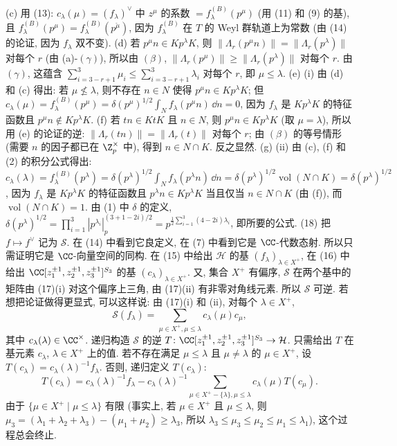\begin{solution}
(c) 用 (13): $c_{\lambda}(\mu) = (f_{\lambda})^{\vee}$ 中 $z^{\mu}$ 的系数 $= f_{\lambda}^{(B)}(p^{\mu})$ (用 (11) 和 (9) 的基), 且 $f_{\lambda}^{(B)}(p^{\mu}) = f_{\lambda}^{(B)}(p^{\check{\mu}})$, 因为 $f_{\lambda}^{(B)}$ 在 $T$ 的 Weyl 群轨道上为常数 (由 (14) 的论证, 因为 $f_{\lambda}$ 双不变).
(d) 若 $p^{\mu}n \in Kp^{\lambda}K$, 则 $\|\Lambda_r(p^{\mu}n)\| = \|\Lambda_r(p^{\lambda})\|$ 对每个 $r$ (由 (a)-$(\gamma)$), 所以由 $(\beta)$, $\|\Lambda_r(p^{\mu})\| \geq \|\Lambda_r(p^{\lambda})\|$ 对每个 $r$. 由 $(\gamma)$, 这蕴含 $\sum_{i=3-r+1}^3\mu_i \leq \sum_{i=3-r+1}^3\lambda_i$ 对每个 $r$, 即 $\mu \leq \lambda$.
(e) (i) 由 (d) 和 (c) 得出: 若 $\mu \nleq \lambda$, 则不存在 $n \in N$ 使得 $p^{\mu}n \in Kp^{\lambda}K$; 但 $c_{\lambda}(\mu) = f_{\lambda}^{(B)}(p^{\mu}) = \delta(p^{\mu})^{1/2}\int_N f_{\lambda}(p^{\mu}n)\,\dd n = 0$, 因为 $f_{\lambda}$ 是 $Kp^{\lambda}K$ 的特征函数且 $p^{\mu}n \notin Kp^{\lambda}K$.
(f) 若 $tn \in KtK$ 且 $n \in N$, 则 $p^{\mu}n \in Kp^{\lambda}K$ (取 $\mu = \lambda$), 所以用 (e) 的论证的逆: $\|\Lambda_r(tn)\| = \|\Lambda_r(t)\|$ 对每个 $r$; 由 $(\beta)$ 的等号情形 (需要 $n$ 的因子都已在 $\Z_p^{\times}$ 中), 得到 $n \in N \cap K$. 反之显然.
(g) (ii) 由 (c), (f) 和 (2) 的积分公式得出: $c_{\lambda}(\lambda) = f_{\lambda}^{(B)}(p^{\lambda}) = \delta(p^{\lambda})^{1/2}\int_N f_{\lambda}(p^{\lambda}n)\,\dd n = \delta(p^{\lambda})^{1/2}\operatorname{vol}(N \cap K) = \delta(p^{\lambda})^{1/2}$, 因为 $f_{\lambda}$ 是 $Kp^{\lambda}K$ 的特征函数且 $p^{\lambda}n \in Kp^{\lambda}K$ 当且仅当 $n \in N \cap K$ (由 (f)), 而 $\operatorname{vol}(N \cap K) = 1$. 由 (1) 中 $\delta$ 的定义, $\delta(p^{\lambda})^{1/2} = \prod_{i=1}^3|p^{\lambda_i}|_p^{(3+1-2i)/2} = p^{\frac{1}{2}\sum_{i=1}^3(4-2i)\lambda_i}$, 即所要的公式.
(18) 把 $f \longmapsto f^{\vee}$ 记为 $\mathcal{S}$. 在 (14) 中看到它良定义, 在 (7) 中看到它是 $\CC$-代数态射. 所以只需证明它是 $\CC$-向量空间的同构. 在 (15) 中给出 $\mathcal{H}$ 的基 $(f_{\lambda})_{\lambda \in X^+}$, 在 (16) 中给出 $\CC[z_1^{\pm 1}, z_2^{\pm 1}, z_3^{\pm 1}]^{S_3}$ 的基 $(c_{\lambda})_{\lambda \in X^+}$. 又, 集合 $X^+$ 有偏序, $\mathcal{S}$ 在两个基中的矩阵由 (17)(i) 对这个偏序上三角, 由 (17)(ii) 有非零对角线元素. 所以 $\mathcal{S}$ 可逆.
若想把论证做得更显式, 可以这样说: 由 (17)(i) 和 (ii), 对每个 $\lambda \in X^+$,
\[
\mathcal{S}(f_{\lambda}) = \sum_{\mu \in X^+, \mu \leq \lambda}c_{\lambda}(\mu)c_{\mu},
\]
其中 $c_{\lambda}(\lambda) \in \CC^{\times}$. 递归构造 $\mathcal{S}$ 的逆 $T \colon \CC[z_1^{\pm 1}, z_2^{\pm 1}, z_3^{\pm 1}]^{S_3} \to \mathcal{H}$. 只需给出 $T$ 在基元素 $c_{\lambda}$, $\lambda \in X^+$ 上的值. 若不存在满足 $\mu \leq \lambda$ 且 $\mu \neq \lambda$ 的 $\mu \in X^+$, 设 $T(c_{\lambda}) = c_{\lambda}(\lambda)^{-1}f_{\lambda}$. 否则, 递归定义 $T(c_{\lambda})$:
\[
T(c_{\lambda}) = c_{\lambda}(\lambda)^{-1}f_{\lambda} - c_{\lambda}(\lambda)^{-1}\sum_{\mu \in X^+ - \{\lambda\}, \mu \leq \lambda}c_{\lambda}(\mu)T(c_{\mu}).
\]
由于 $\{\mu \in X^+ \mid \mu \leq \lambda\}$ 有限 (事实上, 若 $\mu \in X^+$ 且 $\mu \leq \lambda$, 则 $\mu_3 = (\lambda_1 + \lambda_2 + \lambda_3) - (\mu_1 + \mu_2) \geq \lambda_3$, 所以 $\lambda_3 \leq \mu_3 \leq \mu_2 \leq \mu_1 \leq \lambda_1$), 这个过程总会终止.
\end{solution}

